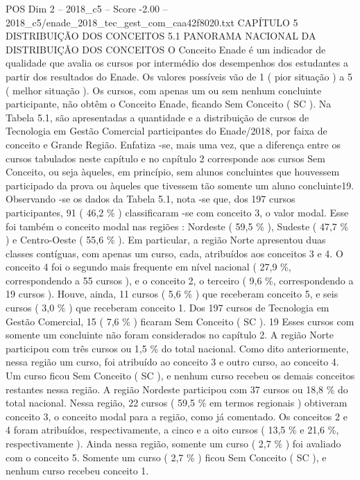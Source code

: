\begin{textsample}{POS Dim 2 – 2018\_c5 – Score -2.00 – 2018\_c5/enade\_2018\_tec\_gest\_com\_caa42f8020.txt}  \label{ex:f2_pos_323}
CAPÍTULO 5 DISTRIBUIÇÃO DOS CONCEITOS 5.1 PANORAMA NACIONAL DA DISTRIBUIÇÃO DOS CONCEITOS O Conceito Enade é um indicador de qualidade que avalia os cursos por intermédio dos desempenhos dos estudantes a partir dos resultados do Enade.
Os valores possíveis vão de 1 ( pior situação ) a 5 ( melhor situação ).
Os cursos, com apenas um ou sem nenhum concluinte participante, não obtêm o Conceito Enade, ficando Sem Conceito ( SC ).
Na Tabela 5.1, são apresentadas a quantidade e a distribuição de cursos de Tecnologia em Gestão Comercial participantes do Enade/2018, por faixa de conceito e Grande Região.
Enfatiza -se, mais uma vez, que a diferença entre os cursos tabulados neste capítulo e no capítulo 2 corresponde aos cursos Sem Conceito, ou seja àqueles, em princípio, sem alunos concluintes que houvessem participado da prova ou àqueles que tivessem tão somente um aluno concluinte19.
Observando -se os dados da Tabela 5.1, nota -se que, dos 197 cursos participantes, 91 ( 46,2 \% ) classificaram -se com conceito 3, o valor modal.
Esse foi também o conceito modal nas regiões : Nordeste ( 59,5 \% ), Sudeste ( 47,7 \% ) e Centro-Oeste ( 55,6 \% ).
Em particular, a região Norte apresentou duas classes contíguas, com apenas um curso, cada, atribuídos aos conceitos 3 e 4.
O conceito 4 foi o segundo mais frequente em nível nacional ( 27,9 \%, correspondendo a 55 cursos ), e o conceito 2, o terceiro ( 9,6 \%, correspondendo a 19 cursos ).
Houve, ainda, 11 cursos ( 5,6 \% ) que receberam conceito 5, e seis cursos ( 3,0 \% ) que receberam conceito 1.
Dos 197 cursos de Tecnologia em Gestão Comercial, 15 ( 7,6 \% ) ficaram Sem Conceito ( SC ). 19 Esses cursos com somente um concluinte não foram considerados no capítulo 2.
A região Norte participou com três cursos ou 1,5 \% do total nacional.
Como dito anteriormente, nessa região um curso, foi atribuído ao conceito 3 e outro curso, ao conceito 4.
Um curso ficou Sem Conceito ( SC ), e nenhum curso recebeu os demais conceitos restantes nessa região.
A região Nordeste participou com 37 cursos ou 18,8 \% do total nacional.
Nessa região, 22 cursos ( 59,5 \% em termos regionais ) obtiveram conceito 3, o conceito modal para a região, como já comentado.
Os conceitos 2 e 4 foram atribuídos, respectivamente, a cinco e a oito cursos ( 13,5 \% e 21,6 \%, respectivamente ).
Ainda nessa região, somente um curso ( 2,7 \% ) foi avaliado com o conceito 5.
Somente um curso ( 2,7 \% ) ficou Sem Conceito ( SC ), e nenhum curso recebeu conceito 1.

\end{textsample}
